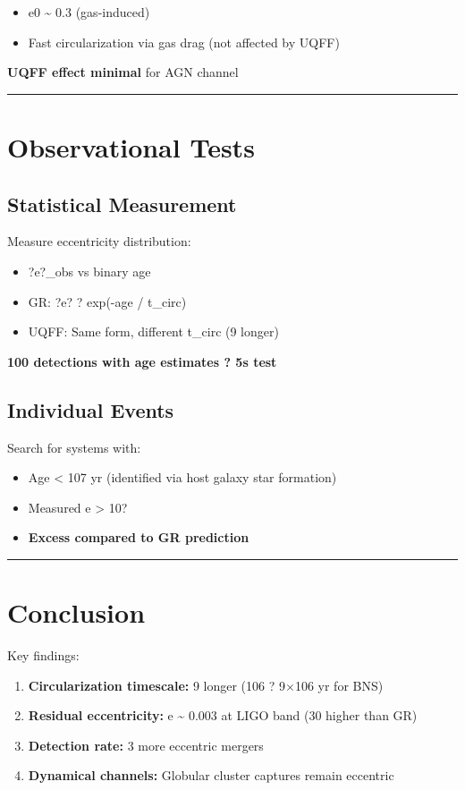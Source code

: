 \documentclass[12pt,a4paper]{article}
\begin{document}
\begin{itemize}
  \item e0 \textasciitilde{} 0.3 (gas-induced)
  \item Fast circularization via gas drag (not affected by UQFF)
\end{itemize}

\textbf{UQFF effect minimal} for AGN channel

\medskip\hrule\medskip

\section{Observational Tests}

\subsection{Statistical Measurement}

Measure eccentricity distribution:

\begin{itemize}
  \item ?e?\_obs vs binary age
  \item GR: ?e? ? exp(-age / t\_circ)
  \item UQFF: Same form, different t\_circ (9 longer)
\end{itemize}

\textbf{100 detections with age estimates ? 5s test}

\subsection{Individual Events}

Search for systems with:

\begin{itemize}
  \item Age < 107 yr (identified via host galaxy star formation)
  \item Measured e > 10?
  \item \textbf{Excess compared to GR prediction}
\end{itemize}

\medskip\hrule\medskip

\section{Conclusion}

Key findings:

\begin{enumerate}
  \item \textbf{Circularization timescale:} 9 longer (106 ? 9$\times$106 yr for BNS)
  \item \textbf{Residual eccentricity:} e \textasciitilde{} 0.003 at LIGO band (30 higher than GR)
  \item \textbf{Detection rate:} 3 more eccentric mergers
  \item \textbf{Dynamical channels:} Globular cluster captures remain eccentric
\end{enumerate}
\end{document}
